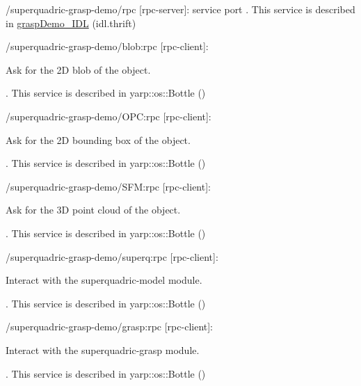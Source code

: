 \begin{DoxyItemize}
\item /superquadric-\/grasp-\/demo/rpc \mbox{[}rpc-\/server\mbox{]}\+: service port . This service is described in \hyperlink{classgraspDemo__IDL}{grasp\+Demo\+\_\+\+I\+DL} (idl.\+thrift)
\item /superquadric-\/grasp-\/demo/blob\+:rpc \mbox{[}rpc-\/client\mbox{]}\+:

Ask for the 2D blob of the object.

. This service is described in yarp\+::os\+::\+Bottle ()
\item /superquadric-\/grasp-\/demo/\+O\+PC\+:rpc \mbox{[}rpc-\/client\mbox{]}\+:

Ask for the 2D bounding box of the object.

. This service is described in yarp\+::os\+::\+Bottle ()
\item /superquadric-\/grasp-\/demo/\+S\+FM\+:rpc \mbox{[}rpc-\/client\mbox{]}\+:

Ask for the 3D point cloud of the object.

. This service is described in yarp\+::os\+::\+Bottle ()
\item /superquadric-\/grasp-\/demo/superq\+:rpc \mbox{[}rpc-\/client\mbox{]}\+:

Interact with the superquadric-\/model module.

. This service is described in yarp\+::os\+::\+Bottle ()
\item /superquadric-\/grasp-\/demo/grasp\+:rpc \mbox{[}rpc-\/client\mbox{]}\+:

Interact with the superquadric-\/grasp module.

. This service is described in yarp\+::os\+::\+Bottle () 
\end{DoxyItemize}